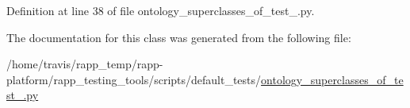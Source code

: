Definition at line 38 of file ontology\-\_\-superclasses\-\_\-of\-\_\-test\-\_.\-py.



The documentation for this class was generated from the following file\-:\begin{DoxyCompactItemize}
\item 
/home/travis/rapp\-\_\-temp/rapp-\/platform/rapp\-\_\-testing\-\_\-tools/scripts/default\-\_\-tests/\hyperlink{ontology__superclasses__of__test__1_8py}{ontology\-\_\-superclasses\-\_\-of\-\_\-test\-\_.\-py}\end{DoxyCompactItemize}
